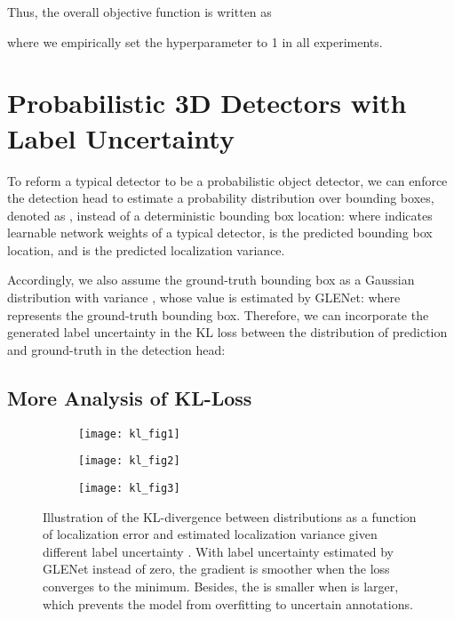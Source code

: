 \documentclass[twocolumn]{svjour3}
\begin{document}
Thus, the overall objective function is written as 

where we empirically set the hyperparameter  to 1 in all experiments.


\section{Probabilistic 3D Detectors with Label Uncertainty} \label{bbr_label_uncertainty}





To reform a typical detector to be a probabilistic object detector, we can enforce the detection head to estimate a probability distribution over bounding boxes, denoted as , instead of a deterministic bounding box location:
where  indicates learnable network weights of a typical detector,  is the predicted bounding box location, and  is the predicted localization variance.

Accordingly, we also assume the ground-truth bounding box as a Gaussian distribution  with variance , whose value is estimated by GLENet: 
where  represents the ground-truth bounding box.
Therefore, we can incorporate the generated label uncertainty in the KL loss between the distribution of prediction and ground-truth in the detection head:





\subsection{More Analysis of KL-Loss} \label{sec:theoretical analysis}
\begin{figure*}[htp]
\begin{subfigure}{.33\textwidth}
\centering
\texttt{[image: kl\_fig1]}
\caption{}
\label{kl_fig1}
\end{subfigure}
\begin{subfigure}{.33\textwidth}
\centering
\texttt{[image: kl\_fig2]}
\caption{}
\label{kl_fig2}
\end{subfigure}
\begin{subfigure}{.33\textwidth}
\centering
\texttt{[image: kl\_fig3]}
\caption{}
\label{kl_fig3}
\end{subfigure}
\caption{Illustration of the KL-divergence between distributions as a function of localization error  and estimated localization variance  given different label uncertainty . With label uncertainty  estimated by GLENet instead of zero, the gradient is smoother when the loss converges to the minimum. Besides, the  is smaller when  is larger, which prevents the model from overfitting to uncertain annotations.}
\label{fig:loss_surface}
\end{figure*}
\end{document}
